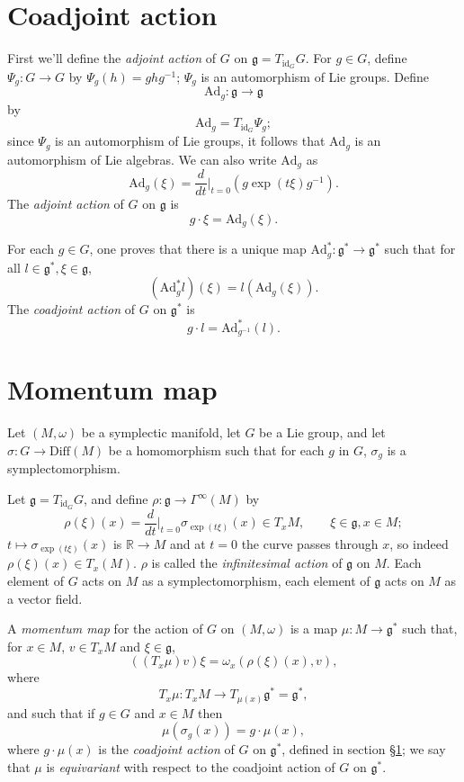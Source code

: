 \documentclass{article}
\newcommand{\Diff}{\textrm{Diff}}
\newcommand{\id}{\textrm{id}}
\newcommand{\Ad}{\textrm{Ad}}
\begin{document}
\section{Coadjoint action}
\label{coadjoint}
First we'll define the {\em adjoint action} of $G$ on $\mathfrak{g}=T_{\id_G} G$. For $g \in G$, 
define $\Psi_g:G \to G$ by $\Psi_g(h)=ghg^{-1}$; $\Psi_g$ is an automorphism of Lie groups. Define
\[
\Ad_g:\mathfrak{g} \to \mathfrak{g}
\]
by
\[
\Ad_g=T_{\id_G} \Psi_g;
\]
since $\Psi_g$ is an automorphism of Lie groups, it follows that $\Ad_g$ is an automorphism of Lie algebras. We can also write $\Ad_g$ as
\[
\Ad_g(\xi)=\frac{d}{dt}\Big|_{t=0} (g\exp(t\xi)g^{-1}).
\]
The {\em adjoint action} of $G$ on $\mathfrak{g}$ is
\[
g\cdot \xi=\Ad_g(\xi).
\]

For each $g \in G$,
one proves that there is a unique map $\Ad_g^*:\mathfrak{g}^* \to \mathfrak{g}^*$ such that for all $l \in \mathfrak{g}^*,\xi \in \mathfrak{g}$,
\[
(\Ad_g^* l)(\xi)=l(\Ad_g(\xi)).
\]
The {\em coadjoint action} of $G$ on $\mathfrak{g}^*$ is 
\[
g\cdot l = \Ad_{g^{-1}}^*(l).
\]

\section{Momentum map}
Let $(M,\omega)$ be a symplectic manifold, let $G$ be a Lie group, and let $\sigma:G \to \Diff(M)$ be a homomorphism such that for each $g$ in $G$, $\sigma_g$ is a symplectomorphism.

Let $\mathfrak{g}=T_{\id_G}G$, and
define $\rho:\mathfrak{g} \to \Gamma^\infty(M)$ by
\[
\rho(\xi)(x)= \frac{d}{dt}\Big|_{t=0}  \sigma_{\exp(t\xi)} ( x)  \in T_xM, \qquad \xi \in \mathfrak{g}, x \in M;
\]
$t \mapsto \sigma_{\exp(t\xi)}(x)$ is $\mathbb{R} \to M$ and at $t=0$ the curve passes through $x$, so indeed $\rho(\xi)(x) \in T_x(M)$. 
$\rho$ is called the {\em infinitesimal action} of $\mathfrak{g}$ on $M$. Each element of $G$ acts on $M$ as a symplectomorphism, each element of
$\mathfrak{g}$ acts on $M$ as a vector field.

A {\em momentum map} for the action of $G$ on $(M,\omega)$ is a map $\mu:M \to \mathfrak{g}^*$ such that, for  $x \in M$, $v \in T_x M$ and $\xi \in \mathfrak{g}$,
\begin{equation}
((T_x \mu)v )\xi=\omega_x (\rho(\xi)(x),v),
\label{mapcondition}
\end{equation}
where
\[
T_x\mu:T_x M \to T_{\mu(x)} \mathfrak{g}^*=\mathfrak{g}^*,
\]
and such that if $g \in G$ and $x \in M$ then
\begin{equation}
\mu(\sigma_g( x))=g \cdot  \mu(x),
\label{equivariant}
\end{equation}
where $g \cdot \mu(x)$ is the {\em coadjoint action} of $G$ on $\mathfrak{g}^*$, defined in  section \S \ref{coadjoint}; we say that
$\mu$ is {\em equivariant} with
respect to the coadjoint action of $G$ on $\mathfrak{g}^*$.
\end{document}
